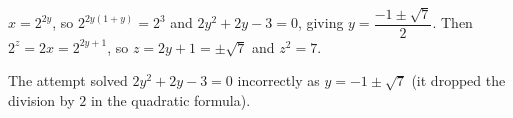 $x=2^{2y}$, so $2^{2y(1+y)}=2^3$ and $2y^2+2y-3=0$, giving $y=\dfrac{-1\pm\sqrt7}2$. Then $2^z=2x=2^{2y+1}$, so $z=2y+1=\pm\sqrt7$ and $z^2=\boxed{7}$.

The attempt solved $2y^2+2y-3=0$ incorrectly as $y=-1\pm\sqrt7$ (it dropped the division by $2$ in the quadratic formula).
